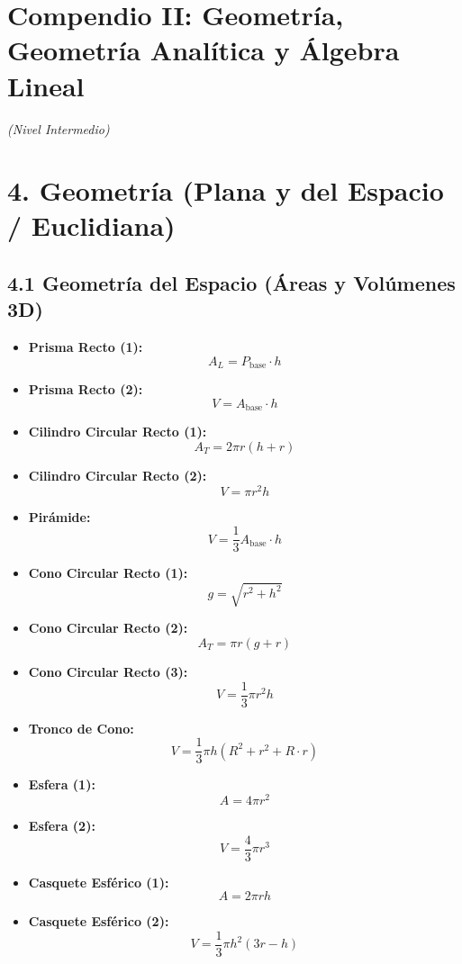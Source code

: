 \documentclass[11pt,a4paper]{article}
\begin{document}
\section*{Compendio II: Geometría, Geometría Analítica y Álgebra Lineal}

\textit{(Nivel Intermedio)}

\section*{4. Geometría (Plana y del Espacio / Euclidiana)}

\subsection*{4.1 Geometría del Espacio (Áreas y Volúmenes 3D)}

\begin{itemize}
  \item \textbf{Prisma Recto (1):}
  \[
    A_L = P_{\text{base}} \cdot h
  \]
  \item \textbf{Prisma Recto (2):}
  \[
    V = A_{\text{base}} \cdot h
  \]
  \item \textbf{Cilindro Circular Recto (1):}
  \[
    A_T = 2\pi r(h + r)
  \]
  \item \textbf{Cilindro Circular Recto (2):}
  \[
    V = \pi r^2 h
  \]
  \item \textbf{Pirámide:}
  \[
    V = \frac{1}{3} A_{\text{base}} \cdot h
  \]
  \item \textbf{Cono Circular Recto (1):}
  \[
    g = \sqrt{r^2 + h^2}
  \]
  \item \textbf{Cono Circular Recto (2):}
  \[
    A_T = \pi r(g + r)
  \]
  \item \textbf{Cono Circular Recto (3):}
  \[
    V = \frac{1}{3} \pi r^2 h
  \]
  \item \textbf{Tronco de Cono:}
  \[
    V = \frac{1}{3} \pi h (R^2 + r^2 + R \cdot r)
  \]
  \item \textbf{Esfera (1):}
  \[
    A = 4\pi r^2
  \]
  \item \textbf{Esfera (2):}
  \[
    V = \frac{4}{3} \pi r^3
  \]
  \item \textbf{Casquete Esférico (1):}
  \[
    A = 2\pi r h
  \]
  \item \textbf{Casquete Esférico (2):}
  \[
    V = \frac{1}{3} \pi h^2 (3r - h)
  \]
\end{itemize}
\end{document}

